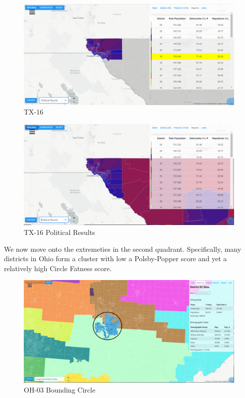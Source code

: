 \documentclass[letterpaper]{article}
\begin{document}
\begin{figure}[H]
	\includegraphics[width=\linewidth]{./figures/TX-16.png}
	\caption{TX-16}
	\label{fig:tx16border}
\end{figure}

\begin{figure}[H]
	\includegraphics[width=\linewidth]{./figures/TX-16-SurroundingArea.png}
	\caption{TX-16 Political Results}
	\label{fig:tx16political}
\end{figure}

We now move onto the extremeties in the second quadrant. Specifically, many districts in Ohio form a cluster with low a Polsby-Popper score and yet a relatively high Circle Fatness score.

\begin{figure}[H]
	\includegraphics[width=\linewidth]{./figures/OH-03-BoundingCircle.png}
	\caption{OH-03 Bounding Circle}
	\label{fig:oh03boundingCircle}
\end{figure}
\end{document}
